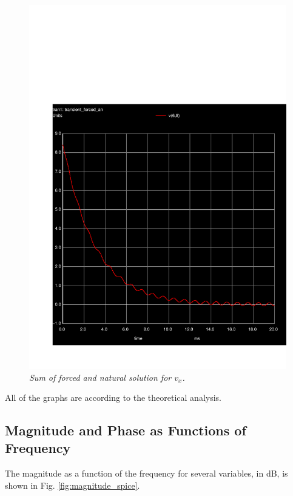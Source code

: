 \vspace{-13mm}
\begin{figure}[H]
    \centering
    \includegraphics[width = 0.85\linewidth]{../sim/trans6.pdf}
        \caption{\textit{Sum of forced and natural solution for $v_x$.}}
    \label{fig:ngspice_f}
\end{figure}

All of the graphs are according to the theoretical analysis.

\subsection{Magnitude and Phase as Functions of Frequency}

The magnitude as a function of the frequency for several variables, in dB, is shown in Fig. \ref{fig:magnitude_spice}.


